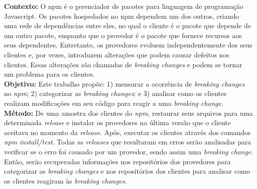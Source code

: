 \begin{resumo}

\textbf{Contexto:} O \textsf{npm} é o gerenciador de pacotes para linguagem de programação \textsf{Javascript}. Os pacotes hospedados no \textsf{npm} dependem um dos outros, criando uma rede de dependências entre eles, no qual o cliente é o pacote que depende de um outro pacote, enquanto que o provedor é o pacote que fornece recursos aos seus dependentes. Entretanto, os provedores evoluem independentemente dos seus clientes e, por vezes, introduzem alterações que podem causar defeitos nos clientes. Essas alterações são chamadas de \textit{breaking changes} e podem se tornar um problema para os clientes.\\
\textbf{Objetivo:} Este trabalho propõe: 1) mensurar a ocorrência de \textit{breaking changes} no \textit{npm}; 2) categorizar as \textit{breaking changes}; e 3) analisar como os clientes realizam modificações em seu código para reagir a uma \textit{breaking change}.\\
\textbf{Método:} De uma amostra dos clientes do \textit{npm}, restaurar seus arquivos para uma determinada \textit{release} e instalar os provedores na última versão que o cliente aceitava no momento da \textit{release}. Após, executar os clientes através dos comandos \textit{npm install/test}. Todas as \textit{releases} que resultaram em erros serão analisadas para verificar se o erro foi causado por um provedor, sendo assim uma \textit{breaking change}. Então, serão recuperadas informações nos repositórios dos provedores para categorizar as \textit{breaking changes} e nos repositórios dos clientes para analisar como os clientes reagiram às \textit{breaking changes}.\\

\end{resumo}